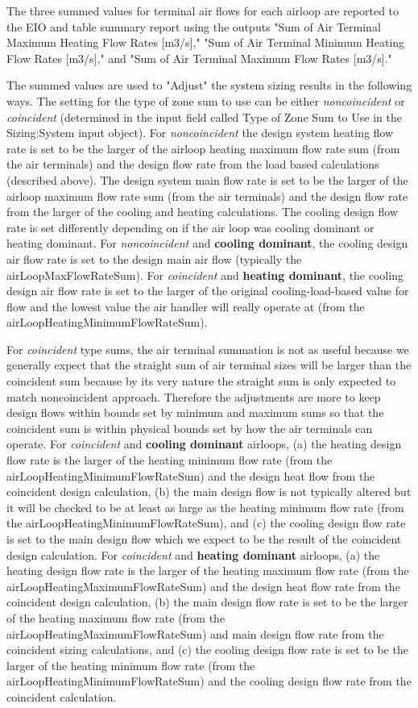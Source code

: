 The three summed values for terminal air flows for each airloop are reported to the EIO and table summary report using the outputs "Sum of Air Terminal Maximum Heating Flow Rates [m3/s]," "Sum of Air Terminal Minimum Heating Flow Rates [m3/s]," and "Sum of Air Terminal Maximum Flow Rates [m3/s]."

 The summed values are used to "Adjust" the system sizing results in the following ways.  The setting for the type of zone sum to use can be either \emph{noncoincident} or \emph{coincident} (determined in the input field called Type of Zone Sum to Use in the Sizing:System input object).  For \emph{noncoincident} the design system heating flow rate is set to be the larger of the airloop heating maximum flow rate sum (from the air terminals) and the design flow rate from the load based calculations (described above).  The design system main flow rate is set to be the larger of the airloop maximum flow rate sum (from the air terminals) and the design flow rate from the larger of the cooling and heating calculations. The cooling design flow rate is set differently depending on if the air loop was cooling dominant or heating dominant.  For \emph{noncoincident} and \textbf{cooling dominant}, the cooling design air flow rate is set to the design main air flow (typically the airLoopMaxFlowRateSum). For \emph{coincident} and \textbf{heating dominant}, the cooling design air flow rate is set to the larger of the original cooling-load-based value for flow and the lowest value the air handler will really operate at (from the airLoopHeatingMinimumFlowRateSum).

 For \emph{coincident} type sums, the air terminal summation is not as useful because we generally expect that the straight sum of air terminal sizes will be larger than the coincident sum because by its very nature the straight sum is only expected to match noncoincident approach.  Therefore the adjustments are more to keep design flows within bounds set by minimum and maximum sums so that the coincident sum is within physical bounds set by how the air terminals can operate.  For \emph{coincident} and \textbf{cooling dominant} airloops,  (a) the heating design flow rate is the larger of the heating minimum flow rate (from the airLoopHeatingMinimumFlowRateSum) and the design heat flow from the coincident design calculation, (b) the main design flow is not typically altered but it will be checked to be at least as large as the heating minimum flow rate (from the airLoopHeatingMinimumFlowRateSum), and (c) the cooling design flow rate is set to the main design flow which we expect to be the result of the coincident design calculation.  For \emph{coincident} and \textbf{heating dominant} airloops, (a) the heating design flow rate is the larger of the heating maximum flow rate (from the airLoopHeatingMaximumFlowRateSum) and the design heat flow rate from the coincident design calculation, (b) the main design flow rate is set to be the larger of the heating maximum flow rate (from the airLoopHeatingMaximumFlowRateSum) and main design flow rate from the coincident sizing calculations, and (c) the cooling design flow rate is set to be the larger of the heating minimum flow rate (from the airLoopHeatingMinimumFlowRateSum) and the cooling design flow rate from the coincident calculation.

